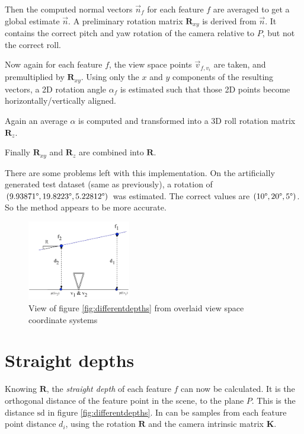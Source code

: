 \documentclass[11pt]{scrreprt}
\newcommand{\matr}[1]{\mathbf{#1}}
\newcommand{\degr}{\text{\textdegree}}
\begin{document}
Then the computed normal vectors $\vec{n}_f$ for each feature $f$ are averaged to get a global estimate $\vec{n}$. A preliminary rotation matrix $\matr{R}_{xy}$ is derived from $\vec{n}$. It contains the correct pitch and yaw rotation of the camera relative to $P$, but not the correct roll.

Now again for each feature $f$, the view space points $\vec{v}_{f,v_i}$ are taken, and premultiplied by $\matr{R}_{xy}$. Using only the $x$ and $y$ components of the resulting vectors, a 2D rotation angle $\alpha_f$ is estimated such that those 2D points become horizontally/vertically aligned.

Again an average $\alpha$ is computed and transformed into a 3D roll rotation matrix $\matr{R}_z$.

Finally $\matr{R}_{xy}$ and $\matr{R}_z$ are combined into $\matr{R}$.

There are some problems left with this implementation. On the artificially generated test dataset (same as previously), a rotation of $(9.93871\degr, 19.8223\degr, 5.22812\degr)$ was estimated. The correct values are $(10\degr, 20\degr, 5\degr)$. So the method appears to be more accurate.


\begin{figure}
\centering
\includegraphics[width=0.4\textwidth]{differentdepthsview.pdf}
\caption{View of figure \ref{fig:differentdepths} from overlaid view space coordinate systems}
\label{fig:differentdepthsview}
\end{figure}


\pagebreak

\section{Straight depths}
\label{ref:straightdepths}
Knowing $\matr{R}$, the \emph{straight depth} of each feature $f$ can now be calculated. It is the orthogonal distance of the feature point in the scene, to the plane $P$. This is the distance $\text{sd}$ in figure \ref{fig:differentdepths}. In can be samples from each feature point distance $d_i$, using the rotation $\matr{R}$ and the camera intrinsic matrix $\matr{K}$.
\end{document}
